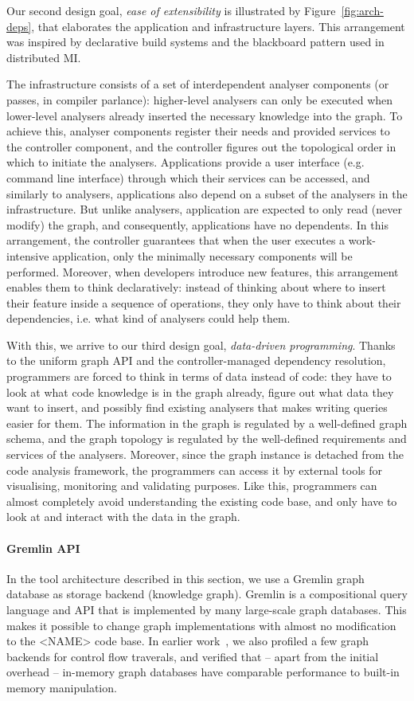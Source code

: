 \documentclass[sigconf]{acmart}
\begin{document}
Our second design goal, \textit{ease of extensibility} is illustrated by Figure~\ref{fig:arch-deps}, that elaborates the application and infrastructure layers. 
This arrangement was inspired by declarative build systems and the blackboard pattern used in distributed MI.

The infrastructure consists of a set of interdependent analyser components (or passes, in compiler parlance): higher-level analysers can only be executed when lower-level analysers already inserted the necessary knowledge into the graph. To achieve this, analyser components register their needs and provided services to the controller component, and the controller figures out the topological order in which to initiate the analysers. 
Applications provide a user interface (e.g. command line interface) through which their services can be accessed, and similarly to analysers, applications also depend on a subset of the analysers in the infrastructure. But unlike analysers, application are expected to only read (never modify) the graph, and consequently, applications have no dependents. 
In this arrangement, the controller guarantees that when the user executes a work-intensive application, only the minimally necessary components will be performed.
Moreover, when developers introduce new features, this arrangement enables them to think declaratively: instead of thinking about where to insert their feature inside a sequence of operations, they only have to think about their dependencies, i.e. what kind of analysers could help them.

With this, we arrive to our third design goal, \textit{data-driven programming}. Thanks to the uniform graph API and the controller-managed dependency resolution, programmers are forced to think in terms of data instead of code: they have to look at what code knowledge is in the graph already, figure out what data they want to insert, and possibly find existing analysers that makes writing queries  easier for them. 
The information in the graph is regulated by a well-defined graph schema, and the graph topology is regulated by the well-defined requirements and services of the analysers. Moreover, since the graph instance is detached from the code analysis framework, the programmers can access it by external tools for visualising, monitoring and validating purposes.
Like this, programmers can almost completely avoid understanding the existing code base, and only have to look at and interact with the data in the graph.  

\paragraph{Gremlin API}
In the tool architecture described in this section, we use a Gremlin graph database as storage backend (knowledge graph). Gremlin is a compositional query language and API that is implemented by many large-scale graph databases. This makes it possible to change graph implementations with almost no modification to the <NAME> code base. In earlier work~\cite{icai20}, we also profiled a few graph backends for control flow traverals, and verified that -- apart from the initial overhead -- in-memory graph databases have comparable performance to built-in memory manipulation. 
\end{document}
